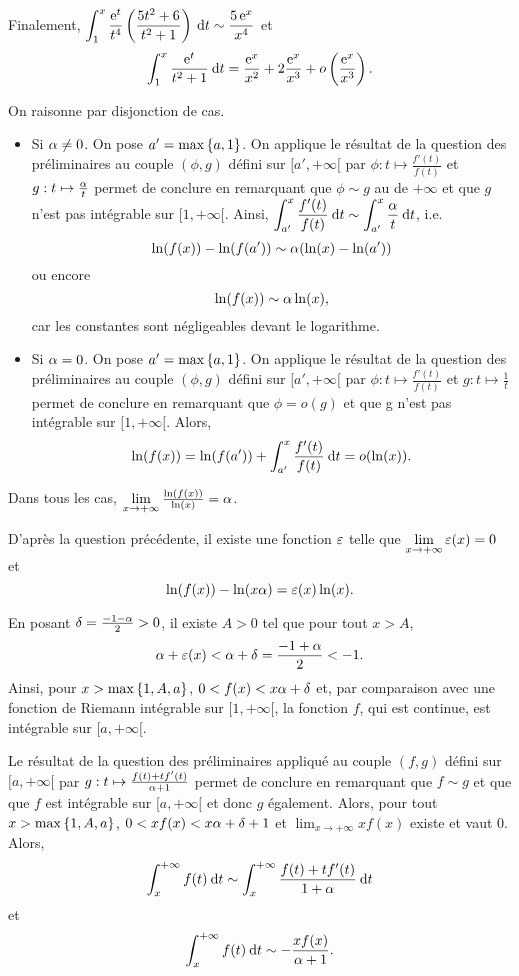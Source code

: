 \documentclass[oneside,11pt]{book}
\begin{document}
\begin{solution*}
Finalement, $\displaystyle \int_1^x \frac{\operatorname{e}^t}{t^4}\left(\frac{5 t^2 + 6}{t^2 + 1}\right) \:{\text d}t \sim \frac{5 \operatorname{e}^x}{x^4}$ et
\[
\displaystyle \int_1^x \frac{\operatorname{e}^t}{t^2 + 1} \:{\text d}t = \frac{\operatorname{e}^x}{x^2} + 2 \frac{\operatorname{e}^x}{x^3} + o\left(\frac{\operatorname{e}^x}{x^3}\right).
\]

\partie{}

\qu On raisonne par disjonction de cas.
\begin{itemize}
\item Si $\alpha \neq 0$. On pose $a' = \max\left\{a, 1\right\}$. On applique le résultat de la question  des préliminaires au couple $(\phi, g)$ défini sur $[a', +\infty[$ par $\phi : t \mapsto \frac{f'(t)}{f(t)}$ et $g : t \mapsto \frac{\alpha}{t}$ permet de conclure en remarquant que $\phi \sim g$ au de $+\infty$ et que $g$ n'est pas intégrable sur $[1,+\infty[$. Ainsi, $\displaystyle \int_{a'}^{x} \frac{f'(t)}{f(t)} \:{\text d}t \sim \displaystyle \int_{a'}^x \frac{\alpha}{t} \:{\text d}t$, i.e.
\[
\ln(f(x)) - \ln(f(a')) \sim \alpha (\ln(x) - \ln(a'))
\]
ou encore
\[
\ln(f(x)) \sim \alpha \ln(x),
\]
car les constantes sont négligeables devant le logarithme.

\item Si $\alpha = 0$. On pose $a' = \max\left\{a, 1\right\}$. On applique le résultat de la question  des préliminaires au couple $(\phi, g)$ défini sur $[a', +\infty[$ par $\phi : t \mapsto \frac{f'(t)}{f(t)}$ et $g : t \mapsto \frac{1}{t}$ permet de conclure en remarquant que $\phi = o(g)$ et que g n’est pas intégrable sur $[1, +\infty[$. Alors,
\[
\ln(f(x)) = \ln(f(a')) + \displaystyle \int_{a'}^x \frac{f'(t)}{f(t)} \:{\text d}t = o(\ln(x)).
\]
\end{itemize}

Dans tous les cas, $\lim\limits_{x\to+\infty} \frac{\ln(f(x))}{\ln(x)} = \alpha$.

\Qu D'après la question précédente, il existe une fonction $\varepsilon$ telle que $\lim\limits_{x\to+\infty} \varepsilon(x) = 0$ et
\[
\ln(f(x)) - \ln(x \alpha) = \varepsilon (x) \ln(x).
\]

En posant $\delta = \frac{-1-\alpha}{2} > 0$, il existe $A > 0$ tel que pour tout $x > A$,
\[
\alpha + \varepsilon(x) < \alpha + \delta = \frac{-1+\alpha}{2} < -1.
\]
Ainsi, pour $x > \max\left\{1 , A , a\right\}$, $0 < f(x) < x \alpha + \delta$ et, par comparaison avec une fonction de Riemann intégrable sur $[1, +\infty[$, la fonction $f$, qui est continue, est intégrable sur $[a, +\infty[$.

\squ Le résultat de la question  des préliminaires appliqué au couple $(f, g)$ défini sur $[a, +\infty[$ par $g : t \mapsto \frac{f(t) + tf ' (t)}{\alpha+1}$ permet de conclure en remarquant que $f \sim g$ et que que $f$ est intégrable sur $[a, +\infty[$ et donc $g$ également. Alors, pour tout $x > \max\left\{1, A, a\right\}$, $0 < xf(x) < x \alpha + \delta + 1$ et $\lim_{x\to+\infty} x f(x)$ existe et vaut $0$. Alors,
\[
\displaystyle \int_x^{+\infty} f(t) \:{\text d}t \sim \displaystyle \int_x^{+\infty} \frac{f(t) + tf ' (t)}{1+\alpha} \:{\text d}t
\]
et
\[
\displaystyle \int_x^{+\infty} f(t) \:{\text d}t \sim - \frac{x f(x)}{\alpha + 1}.
\]


\end{solution*}
\end{document}
